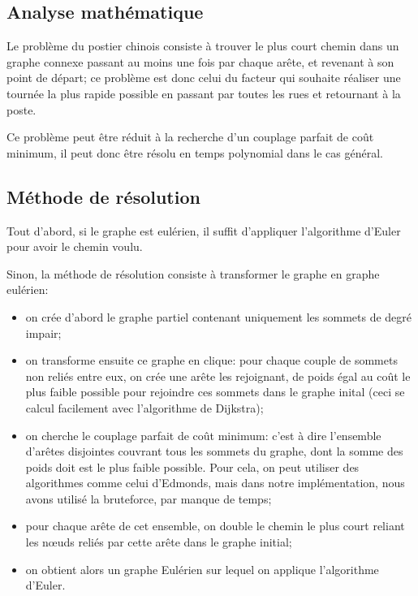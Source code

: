 \documentclass{scrartcl}
\begin{document}
  \subsection{Analyse mathématique}
    Le problème du postier chinois consiste à trouver le plus court chemin dans
    un graphe connexe passant au moins une fois par chaque arête, et revenant
    à son point de départ; ce problème est donc celui du facteur qui souhaite
    réaliser une tournée la plus rapide possible en passant par toutes les rues
    et retournant à la poste. 

    Ce problème peut être réduit à la recherche d'un couplage parfait de coût
    minimum, il peut donc être résolu en temps polynomial dans le cas général.

  \subsection{Méthode de résolution}
    Tout d'abord, si le graphe est eulérien, il suffit d'appliquer l'algorithme
    d'Euler pour avoir le chemin voulu.

    Sinon, la méthode de résolution consiste à transformer le graphe en graphe
    eulérien:
    \begin{itemize}
      \item on crée d'abord le graphe partiel contenant uniquement les sommets
        de degré impair;
      \item on transforme ensuite ce graphe en clique: pour chaque couple de
        sommets non reliés entre eux, on crée une arête les rejoignant,
        de poids égal au coût le plus faible possible pour rejoindre ces
        sommets dans le graphe inital (ceci se calcul facilement avec
        l'algorithme de Dijkstra);
      \item on cherche le couplage parfait de coût minimum: c'est à dire
        l'ensemble d'arêtes disjointes couvrant tous les sommets du graphe,
        dont la somme des poids doit est le plus faible possible.
        Pour cela, on peut utiliser des algorithmes comme celui d'Edmonds, mais
        dans notre implémentation, nous avons utilisé la bruteforce, par manque
        de temps;
      \item pour chaque arête de cet ensemble, on double le chemin le plus court
        reliant les nœuds reliés par cette arête dans le graphe initial;
      \item on obtient alors un graphe Eulérien sur lequel on applique
        l'algorithme d'Euler.
    \end{itemize}
\end{document}
